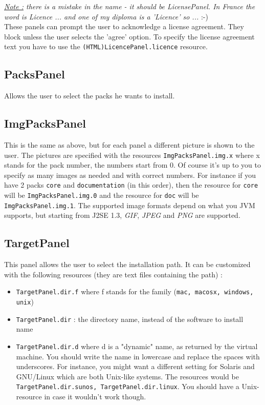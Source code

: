 \noindent
\textit{\underline{Note :} there is a mistake in the name - it should be
LicensePanel. In France the word is Licence ... and one of my diploma is a
'Licence' so ...} :-)\\

These panels can prompt the user to acknowledge a license agreement. They block
unless the user selects the 'agree' option. To specify the license agreement
text you have to use the \texttt{(HTML)LicencePanel.licence} resource.\\

\subsection{PacksPanel}

Allows the user to select the packs he wants to install.\\

\subsection{ImgPacksPanel}

This is the same as above, but for each panel a different picture is
shown to the user. The pictures are specified with the resources
\texttt{ImgPacksPanel.img.x} where x stands for the pack number, the
numbers start from 0. Of course it's up to you to specify as many images
as needed and with correct numbers. For instance if you have 2 packs
\texttt{core} and \texttt{documentation} (in this order), then the resource for
\texttt{core} will be \texttt{ImgPacksPanel.img.0} and the resource for
\texttt{doc} will be \texttt{ImgPacksPanel.img.1}. The supported image formats
depend on what you JVM supports, but starting from J2SE 1.3, \textsl{GIF},
\textsl{JPEG} and \textsl{PNG} are supported.\\

\subsection{TargetPanel}

This panel allows the user to select the installation path. It can be customized with
the following resources (they are text files containing the path) :
\begin{itemize}

  \item \texttt{TargetPanel.dir.f} where f stands for the family (\texttt{mac,
  macosx, windows, unix})
  \item \texttt{TargetPanel.dir} : the directory name, instead of the software
  to install name
  \item \texttt{TargetPanel.dir.d} where d is a "dynamic" name, as returned by
  the \Java virtual machine. You should write the name in lowercase and replace the
  spaces with underscores. For instance, you might want a different setting for
  Solaris and GNU/Linux which are both Unix-like systems. The resources would be
  \texttt{TargetPanel.dir.sunos, TargetPanel.dir.linux}. You should have a
  Unix-resource in case it wouldn't work though.

\end{itemize}\

